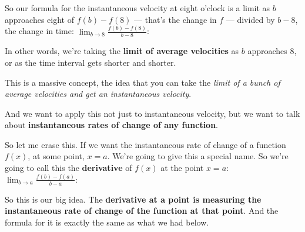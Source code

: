 \documentclass[pdftex, brazil, 12pt, twoside]{article}
\begin{document}
So our formula for the instantaneous velocity
at eight o'clock is a limit as $b$ approaches
eight of $f(b) - f(8)$ --- that's
the change in $f$ --- divided by $b - 8$, the change in time:
$\displaystyle \lim_{b \to 8}\frac{f(b)-f(8)}{b-8}$:

\begin{figure}[H]
  \begin{center}
  \end{center}
\end{figure}

In other words, we're taking the \textbf{limit of average velocities}
as $b$ approaches 8, or as the time interval gets
shorter and shorter.

This is a massive concept, the idea
that you can take the \emph{limit of a bunch of average velocities
and get an instantaneous velocity}.

And we want to apply this not just to instantaneous velocity,
but we want to talk about \textbf{instantaneous rates of change
of any function}.

So let me erase this.
If we want the instantaneous rate of change of a function
$f(x)$, at some point, $x = a$.
We're going to give this a special name.
So we're going to call this the \textbf{derivative} of $f(x)$
at the point $x = a$: $\displaystyle \lim_{b \to a}\frac{f(b)-f(a)}{b-a}$:

\begin{figure}[H]
  \begin{center}
  \end{center}
\end{figure}

So this is our big idea.
The \textbf{derivative at a point is measuring
the instantaneous rate of change of the function at that point}.
And the formula for it is exactly the same
as what we had below.
\end{document}

